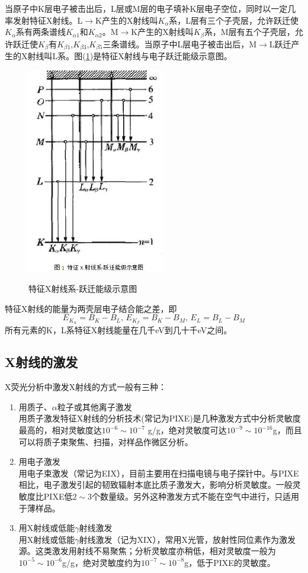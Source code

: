 \documentclass[a4paper]{article}
\begin{document}
当原子中K层电子被击出后，L层或M层的电子填补K层电子空位，同时以一定几率发射特征X射线。L$\to$K产生的X射线叫$K_{\alpha}$系，L层有三个子壳层，允许跃迁使$K_{\alpha}$系有两条谱线$K_{\alpha 1}$和$K_{\alpha 2}$。M$\to$K产生的X射线叫$K_{\beta}$系，M层有五个子壳层，允许跃迁使$K_{\beta}$有$K_{\beta 1}$,$K_{\beta 3}$,$K_{\beta 5}$三条谱线。当原子中L层电子被击出后，M$\to$L跃迁产生的X射线叫L系。图(\ref{Elevel})是特征X射线与电子跃迁能级示意图。
\begin{figure}[H]
\centering
\includegraphics[width=6cm]{fig/Elevel.jpg}\\
\caption{特征X射线系-跃迁能级示意图}\label{Elevel}
\end{figure}
特征X射线的能量为两壳层电子结合能之差，即
\begin{equation}
E_{K_{\alpha}} = B_K - B_L\text{, }E_{K_{\beta}} = B_K - B_M\text{, }E_L = B_L - B_M
\end{equation}
所有元素的K，L系特征X射线能量在几千eV到几十千eV之间。

\subsection{X射线的激发}
X荧光分析中激发X射线的方式一般有三种：
\begin{enumerate}
\item 用质子、$\alpha$粒子或其他离子激发\\
用质子激发特征X射线的分析技术(常记为PIXE)是几种激发方式中分析灵敏度最高的，相对灵敏度达$10^{-6}\sim 10^{-7}$ g/g，绝对灵敏度可达$10^{-9}\sim 10^{-16}$g，而且可以将质子束聚焦、扫描，对样品作微区分析。
\item 用电子激发\\
用电子束激发（常记为EIX），目前主要用在扫描电镜与电子探针中。与PIXE相比，电子激发引起的韧致辐射本底比质子激发大，影响分析灵敏度。一般灵敏度比PIXE低$ 2\sim 3 $个数量级。另外这种激发方式不能在空气中进行，只适用于薄样品。
\item 用X射线或低能$ \gamma $射线激发\\
用X射线或低能$ \gamma $射线激发（记为XIX），常用X光管，放射性同位素作为激发源。这类激发用射线不易聚焦；分析灵敏度亦稍低，相对灵敏度一般为$10^{-5}\sim 10^{-6}$g/g，绝对灵敏度约为$10^{-7}\sim 10^{-8}$g，低于PIXE的灵敏度。
\end{enumerate}
\end{document}

